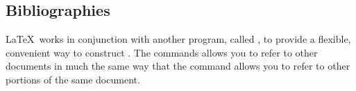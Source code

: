%
%
%

\subsection{Bibliographies}

\LaTeX\ works in conjunction with another program, called , 
to provide
a flexible, convenient way to construct .  The 
commands allows you to refer to other documents in much the same way that the
 command allows you to refer to other portions of the same
document.

